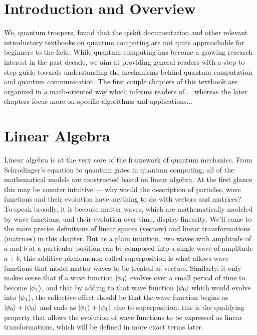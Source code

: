 \documentclass[12pt]{article}
\begin{document}

\setcounter{section}{0}
\section{Introduction and Overview}
We, quantum troopers, found that the qiskit documentation and other relevant introductory textbooks on quantum computing are not quite approachable for beginners to the field. While quantum computing has become a growing research interest in the past decade, we aim at providing general readers with a step-to-step guide towards understanding the mechanisms behind quantum computation and quantum communication. The first couple chapters of this textbook are organized in a math-oriented way which informs readers of....
whereas the later chapters focus more on specific algorithms and applications...

\section{Linear Algebra}
Linear algebra is at the very core of the framework of quantum mechanics. From Schrodinger's equation to quantum gates in quantum computing, all of the mathematical models are constructed based on linear algebra. At the first glance this may be counter intuitive --- why would the description of particles, wave functions and their evolution have anything to do with vectors and matrices?\\
To speak broadly, it is because matter waves, which are mathematically modeled by wave functions, and their evolution over time, display linearity. We'll come to the more precise definitions of linear spaces (vectors) and linear transformations (matrices) in this chapter. But as a plain intuition, two waves with amplitude of $a$ and $b$ at a particular position can be composed into a single wave of amplitude $a+b$, this additive phenomenon called superposition is what allows wave functions that model matter waves to be treated as vectors. Similarly, it only makes sense that if a wave function $\ket{\phi_0}$ evolves over a small period of time to become $\ket{\phi_1}$, and that by adding to that wave function $\ket{\psi_0}$ which would evolve into $\ket{\psi_1}$, the collective effect should be that the wave function begins as $\ket{\phi_0}+\ket{\psi_0}$ and ends as $\ket{\phi_1}+\ket{\psi_1}$ due to superposition; this is the qualifying property that allows the evolution of wave functions to be expressed as linear transformations, which will be defined in more exact terms later.
\end{document}
